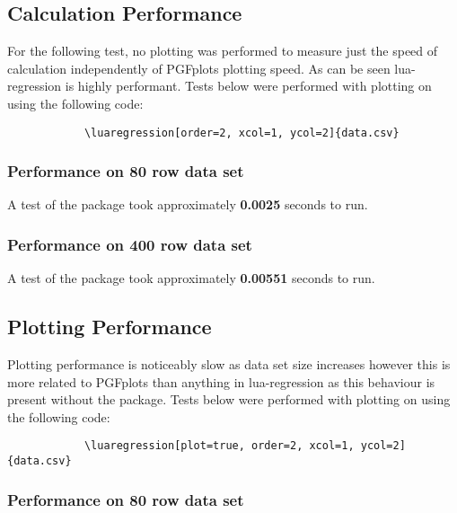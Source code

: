 \documentclass[11pt]{article}
\begin{document}
    
   	\subsection{Calculation Performance}
    
    For the following test, no plotting was performed to measure just the speed of calculation independently of PGFplots plotting speed. 
    As can be seen {\ttfamily lua-regression} is highly performant.
    Tests below were performed with plotting on using the following code:
    
    \begin{codebox}
    	\begin{verbatim}
    		\luaregression[order=2, xcol=1, ycol=2]{data.csv}
    	\end{verbatim}
    \end{codebox}
    
    
    \subsubsection{Performance on 80 row data set}
    
    A test of the package took approximately \textbf{0.0025} seconds to run.
    
    \subsubsection{Performance on 400 row data set}	
    
    A test of the package took approximately \textbf{0.00551} seconds to run.

	\subsection{Plotting Performance}
	
	Plotting performance is noticeably slow as data set size increases however this is more related to PGFplots than anything in {\ttfamily lua-regression} as this behaviour is present without the package.
	Tests below were performed with plotting on using the following code:
	
	\begin{codebox}
		\begin{verbatim}
			\luaregression[plot=true, order=2, xcol=1, ycol=2]{data.csv}
		\end{verbatim}
	\end{codebox}

    \subsubsection{Performance on 80 row data set}
\end{document}
